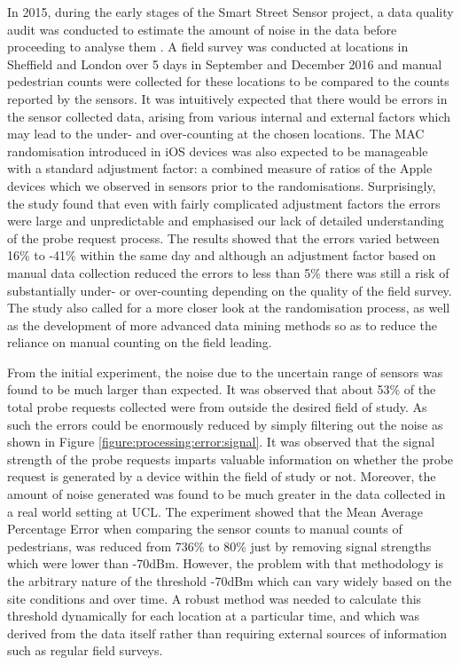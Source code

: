 In 2015, during the early stages of the Smart Street Sensor project, a data quality audit was conducted to estimate the amount of noise in the data before proceeding to analyse them \cite{lugomer2017}.
A field survey was conducted at locations in Sheffield and London over 5 days in September and December 2016 and manual pedestrian counts were collected for these locations to be compared to the counts reported by the sensors.
It was intuitively expected that there would be errors in the sensor collected data, arising from various internal and external factors which may lead to the under- and over-counting at the chosen locations.
The MAC randomisation introduced in iOS devices was also expected to be manageable with a standard adjustment factor: a combined measure of ratios of the Apple devices which we observed in sensors prior to the randomisations.
Surprisingly, the study found that even with fairly complicated adjustment factors the errors were large and unpredictable and emphasised our lack of detailed understanding of the probe request process.
The results showed that the errors varied between 16\% to -41\% within the same day and although an adjustment factor based on manual data collection reduced the errors to less than 5\% there was still a risk of substantially under- or over-counting depending on the quality of the field survey.
The study also called for a more closer look at the randomisation process, as well as the development of more advanced data mining methods so as to reduce the reliance on manual counting on the field leading. 

From the initial experiment, the noise due to the uncertain range of sensors was found to be much larger than expected.
It was observed that about 53\% of the total probe requests collected were from  outside the desired field of study.
As such the errors could be enormously reduced by simply filtering out the noise as shown in Figure \ref{figure:processing:error:signal}.
It was observed that the signal strength of the probe requests imparts valuable information on whether the probe request is generated by a device within the field of study or not.
Moreover, the amount of noise generated was found to be much greater in the data collected in a real world setting at UCL.
The experiment showed that the Mean Average Percentage Error when comparing the sensor counts to manual counts of pedestrians, was reduced from 736\% to  80\% just by removing signal strengths which were lower than -70dBm.
However, the problem with that methodology is the arbitrary nature of the threshold -70dBm which can vary widely based on the site conditions and over time.
A robust method was needed to calculate this threshold dynamically for each location at a particular time, and which was derived from the data itself rather than requiring external sources of information such as regular field surveys.

